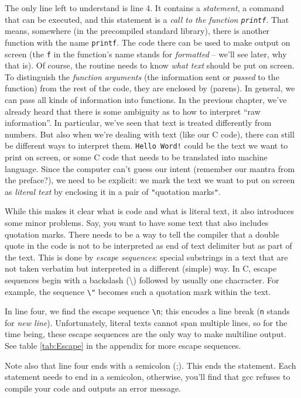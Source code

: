 The only line left to understand is line 4. It contains a \emph{statement}, \ie a command that can be executed, and this statement is a \emph{call to the function \texttt{printf}}. That means, somewhere (in the precompiled standard library), there is another function with the name \texttt{printf}. The code there can be used to make output on screen (the \texttt{f} in the function's name stands for \emph{formatted} -- we'll see later, why that is). Of course, the routine needs to know \emph{what text} should be put on screen. To distinguish the \emph{function arguments} (\ie the information sent or \emph{passed} to the function) from the rest of the code, they are enclosed by (parens). In general, we can pass all kinds of information into functions. In the previous chapter, we've already heard that there is some ambiguity as to how to interpret \enquote{raw information}. In particular, we've seen that text is treated differently from numbers. But also when we're dealing with text (like our C code), there can still be different ways to interpret them. \texttt{Hello Word!} could be the text we want to print on screen, or some C code that needs to be translated into machine language. Since the computer can't guess our intent (remember our mantra from the preface?), we need to be explicit: we mark the text we want to put on screen as \emph{literal text} by enclosing it in a pair of \texttt{"}quotation marks\texttt{"}.

While this makes it clear what is code and what is literal text, it also introduces some minor problems. Say, you want to have some text that also includes quotation marks. There needs to be a way to tell the compiler that a double quote in the code is not to be interpreted as end of text delimiter but as part of the text. This is done by \emph{escape sequences}: special substrings in a text that are not taken verbatim but interpreted in a different (simple) way. In C, escape sequences begin with a backslash (\textbackslash) followed by usually one chacracter. For example, the sequence \texttt{\textbackslash"} becomes such a quotation mark within the text.

In line four, we find the escape sequence \texttt{\textbackslash n}; this encodes a line break (\texttt{n} stands for \emph{new line}). Unfortunately, literal texts cannot span multiple lines, so for the time being, these escape sequences are the only way to make multiline output. See table \ref{tab:Escape} in the appendix for more escape sequences.

Note also that line four ends with a semicolon (;). This ends the statement. Each statement needs to end in a semicolon, otherwise, you'll find that gcc refuses to compile your code and outputs an error message.

